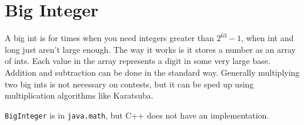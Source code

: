 \section{Big Integer}

A big int is for times when you need integers greater than $2^{63}-1$, when int and long just aren't large enough. The way it works is it stores a number as an array of ints. Each value in the array represents a digit in some very large base. Addition and subtraction can be done in the standard way. Generally multiplying two big ints is not necessary on contests, but it can be sped up using multiplication algorithms like Karatsuba.

\texttt{BigInteger} is in \texttt{java.math}, but C++ does not have an implementation.
